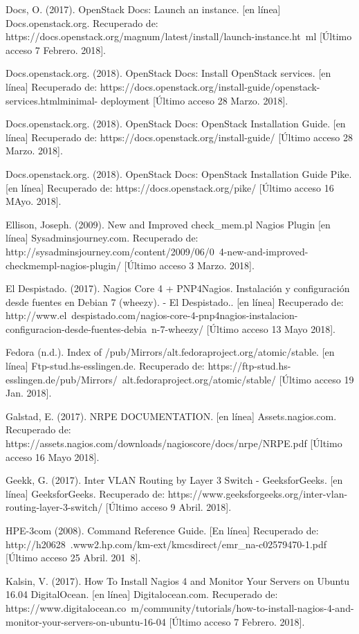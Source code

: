 Docs, O. (2017). OpenStack Docs: Launch an instance. [en línea] Docs.openstack.org. Recuperado de: https://docs.openstack.org/magnum/latest/install/launch-instance.ht\ ml [Último acceso 7 Febrero. 2018].

Docs.openstack.org. (2018). OpenStack Docs: Install OpenStack services. [en línea] Recuperado de: https://docs.openstack.org/install-guide/openstack-services.htmlminimal-
deployment [Último acceso 28 Marzo. 2018].

Docs.openstack.org. (2018). OpenStack Docs: OpenStack Installation Guide. [en línea] Recuperado de: https://docs.openstack.org/install-guide/ [Último acceso 28 Marzo. 2018].

Docs.openstack.org. (2018). OpenStack Docs: OpenStack Installation Guide Pike. [en línea] Recuperado de: https://docs.openstack.org/pike/ [Último acceso 16 MAyo. 2018].

Ellison, Joseph. (2009). New and Improved check\_mem.pl Nagios Plugin  [en línea] Sysadminsjourney.com. Recuperado de: http://sysadminsjourney.com/content/2009/06/0\ 4-\/new-and-improved-checkmempl-nagios-plugin/ [Último acceso 3 Marzo. 2018].    

El Despistado. (2017). Nagios Core 4 + PNP4Nagios. Instalación y configuración desde fuentes en Debian 7 (wheezy). - El Despistado.. [en línea] Recuperado de: http://www.el\ despistado.com/nagios-core-4-pnp4nagios-instalacion-configuracion-desde-fuentes-debia\ n-7-wheezy/ [Último acceso 13 Mayo 2018].

Fedora (n.d.). Index of /pub/Mirrors/alt.fedoraproject.org/atomic/stable. [en línea] Ftp-stud.hs-esslingen.de. Recuperado de: https://ftp-stud.hs-esslingen.de/pub/Mirrors/\ alt.fedoraproject.org/atomic/stable/ [Último acceso 19 Jan. 2018].

Galstad, E. (2017). NRPE DOCUMENTATION. [en línea] Assets.nagios.com. Recuperado de: https://assets.nagios.com/downloads/nagioscore/docs/nrpe/NRPE.pdf [Último acceso 16 Mayo 2018].

Geekk, G. (2017). Inter VLAN Routing by Layer 3 Switch - GeeksforGeeks. [en línea] GeeksforGeeks. Recuperado de: https://www.geeksforgeeks.org/inter-vlan-routing-layer-3-switch/ [Último acceso 9 Abril. 2018].

HPE-3com (2008). Command Reference Guide. [En línea] Recuperado de: http://h20628\ .www2.hp.com/km-ext/kmcsdirect/emr\_na-c02579470-1.pdf [Último acceso 25 Abril. 201\ 8].

Kalsin, V. (2017). How To Install Nagios 4 and Monitor Your Servers on Ubuntu 16.04  DigitalOcean. [en línea] Digitalocean.com. Recuperado de: https://www.digitalocean.co\ m/community/tutorials/how-to-install-nagios-4-and-monitor-your-servers-on-ubuntu-16-04 [Último acceso 7 Febrero. 2018].

